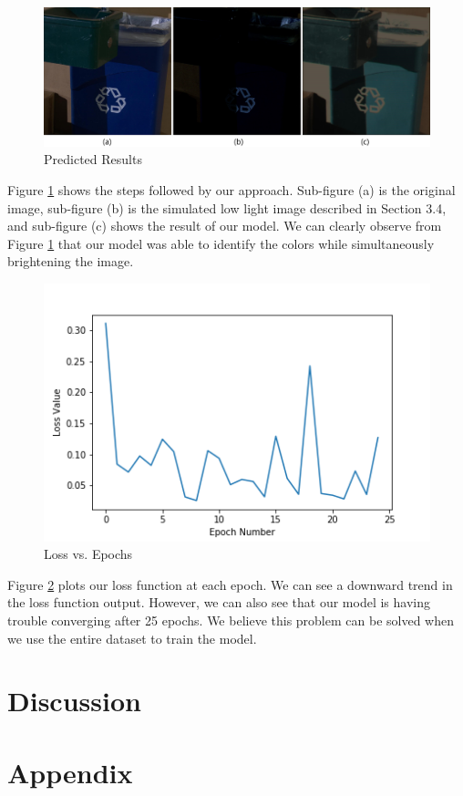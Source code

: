 \documentclass{article}
\begin{document}
\begin{figure}[ht]
  \centering
  \includegraphics[scale=0.1]{trashcan_original_simmulated_and_our_result}
  \caption{ Predicted Results}
  \label{fig:ourmodel}
\end{figure}

Figure \ref{fig:ourmodel} shows the steps followed by our approach.
Sub-figure (a) is the original image, sub-figure (b) is the simulated low
light image described in Section 3.4, and sub-figure (c) shows the result
of our model. We can clearly observe from Figure \ref{fig:ourmodel} that
our model was able to identify the colors while simultaneously brightening
the image.

\begin{figure}[ht]
  \centering
  \includegraphics[scale=0.65]{loss_epoch_our_model}
  \caption{ Loss vs. Epochs}
  \label{fig:ourloss}
\end{figure}

Figure \ref{fig:ourloss} plots our loss function at each epoch. We can
see a downward trend in the loss function output. However, we can also
see that our model is having trouble converging after 25 epochs. We believe
this problem can be solved when we use the entire dataset to train the model.

\section{Discussion}




\section{Appendix}



\end{document}
